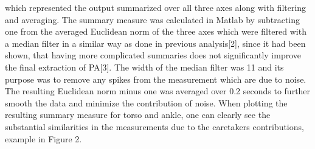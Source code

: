\documentclass{article}
\begin{document}
{ which represented the output summarized over all three axes along with filtering and averaging.
The summary measure was calculated in Matlab by subtracting one from the averaged Euclidean norm of the three axes which were filtered with a median filter in a similar way as done in previous analysis[2], since it had been shown, that having more complicated summaries does not significantly improve the final extraction of PA[3]. The width of the median filter was 11 and its purpose was to remove any spikes from the measurement which are due to noise. The resulting Euclidean norm minus one was averaged over 0.2 seconds to further smooth the data and minimize the contribution of noise. When plotting the resulting summary measure for torso and ankle, one can  clearly see the substantial similarities in the measurements due to the caretakers contributions, example in Figure 2. 


}
\end{document}
